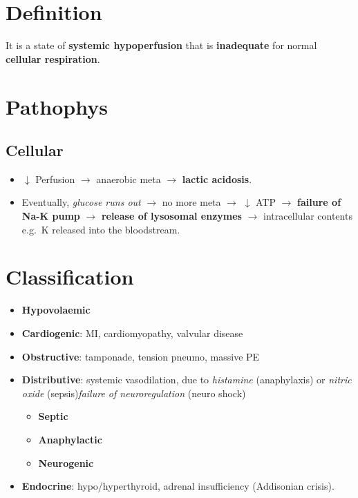 \documentclass[
  14pt,
]{memoir}
\providecommand{\tightlist}{%
  \setlength{\itemsep}{0pt}\setlength{\parskip}{0pt}}
\begin{document}
\hypertarget{definition}{%
\section{Definition}\label{definition}}

It is a state of \textbf{systemic hypoperfusion} that is
\textbf{inadequate} for normal \textbf{cellular respiration}.

\hypertarget{pathophys}{%
\section{Pathophys}\label{pathophys}}

\hypertarget{cellular}{%
\subsection{Cellular}\label{cellular}}

\begin{itemize}
\tightlist
\item
  \(\downarrow\) Perfusion \(\rightarrow\) anaerobic meta
  \(\rightarrow\) \textbf{lactic acidosis}.
\item
  Eventually, \emph{glucose runs out} \(\rightarrow\) no more meta
  \(\rightarrow\) \(\downarrow\) ATP \(\rightarrow\) \textbf{failure of
  Na-K pump} \(\rightarrow\) \textbf{release of lysosomal enzymes}
  \(\rightarrow\) intracellular contents e.g.~K released into the
  bloodstream.
\end{itemize}

\hypertarget{classification}{%
\section{Classification}\label{classification}}

\begin{itemize}
\tightlist
\item
  \textbf{Hypovolaemic}
\item
  \textbf{Cardiogenic}: MI, cardiomyopathy, valvular disease
\item
  \textbf{Obstructive}: tamponade, tension pneumo, massive PE
\item
  \textbf{Distributive}: systemic vasodilation, due to \emph{histamine}
  (anaphylaxis) or \emph{nitric oxide} (sepsis)\emph{failure of
  neuroregulation} (neuro shock)

  \begin{itemize}
  \tightlist
  \item
    \textbf{Septic}
  \item
    \textbf{Anaphylactic}
  \item
    \textbf{Neurogenic}
  \end{itemize}
\item
  \textbf{Endocrine}: hypo/hyperthyroid, adrenal insufficiency
  (Addisonian crisis).
\end{itemize}
\end{document}
